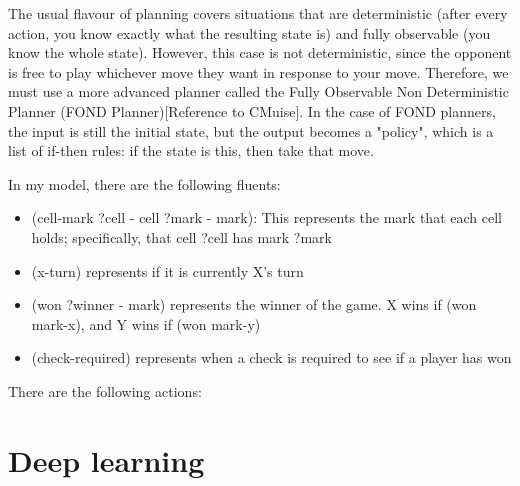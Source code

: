 \documentclass[11pt]{article}
\begin{document}
The usual flavour of planning covers situations that are deterministic (after every action, you know exactly what the resulting state is) and fully observable (you know the whole state). However, this case is not deterministic, since the opponent is free to play whichever move they want in response to your move. Therefore, we must use a more advanced planner called the Fully Observable Non Deterministic Planner (FOND Planner)[Reference to CMuise]. In the case of FOND planners, the input is still the initial state, but the output becomes a "policy", which is a list of if-then rules: if the state is this, then take that move.

In my model, there are the following fluents:
\begin{itemize}
    \item (cell-mark ?cell - cell ?mark - mark): This represents the mark that each cell holds; specifically, that cell ?cell has mark ?mark
    \item (x-turn) represents if it is currently X's turn
    \item (won ?winner - mark) represents the winner of the game. X wins if (won mark-x), and Y wins if (won mark-y) 
    \item (check-required) represents when a check is required to see if a player has won
\end{itemize}

There are the following actions:



\section{Deep learning}

\lipsum[4-5]
\end{document}
